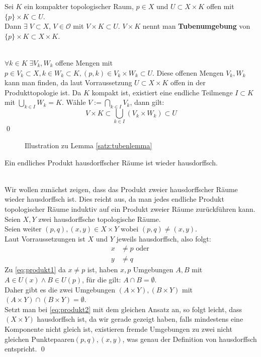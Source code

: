 \begin{Lemma}[Tubenlemma]\label{satz:tubenlemma}
	Sei \(K \) ein kompakter topologischer Raum,  \(p \in X \) und \( U \subset X \times K \) offen mit \( \{p\} \times K \subset U \). \\
	Dann \( \exists \; V \subset X \), \( V \in \mathcal{O} \) mit \( V \times K \subset U \). \( V \times K \) nennt man \textbf{Tubenumgebung} von 
	\( \{p\} \times K \subset X \times K \).
\end{Lemma} 
%
	\\
	\( \forall k \in K \; \exists V_{k}, W_{k}\) offene Mengen mit \( p \in V_{k} \subset X, k \in W_{k} \subset K, (p,k) \in  V_{k} \times W_{k} \subset U\).
	Diese offenen Mengen \(V_{k}, W_{k}\) kann man finden, da laut Vorraussetzung \(U  \subset X \times K \) offen in der Produkttopologie ist.
	Da \(K \) kompakt ist, existiert eine endliche Teilmenge
	\( I \subset K \) mit \( \bigcup_{ k \in I } W_{k} = K \). Wähle \(V := \bigcap_{ k \in I } V_{k} \), dann gilt:
	\[ V \times K \subset \bigcup_{k \in I} (V_{k} \times W_{k}) \subset U \] \qed	\\
%
\begin{figure}[ht]
	\centering
	\def\svgwidth{200}
	
	\label{fig:tubenlemma}
	\caption{Illustration zu Lemma \ref{satz:tubenlemma}}
\end{figure}
%
\begin{Satz}
	Ein endliches Produkt hausdorffscher Räume ist wieder hausdorffsch.
\end{Satz}
%
	\\
	Wir wollen zunächst zeigen, dass das Produkt zweier hausdorffscher Räume wieder hausdorffsch ist. Dies reicht aus, da man jedes endliche Produkt topologischer Räume
	induktiv auf ein Produkt zweier Räume zurückführen kann. \\
	Seien \(X, Y\) zwei hausdorffsche topologische Räume.\\
	Seien weiter \( (p,q), (x,y) \in X \times Y \mbox{ wobei } (p,q) \ne (x,y) \). \\
	Laut Vorraussetzungen ist \(X\) und \(Y\) jeweils hausdorffsch, also folgt: 
	\begin{align}
		x &\ne p \mbox{ oder }\label{eq:produkt1}\\ 
		y &\ne q\label{eq:produkt2} 
	\end{align}
	Zu \eqref{eq:produkt1} da \(x \ne p \) ist, haben \(x, p \) Umgebungen \(A, B \) mit \( A \in U(x)  \land B \in U(p) \), für die gilt: \(A \cap B = \emptyset \).\\ Daher gibt es die
	zwei Umgebungen \( (A \times Y), (B \times Y) \) mit \( (A \times Y) \cap (B \times Y) = \emptyset \). \\
	Setzt man bei \eqref{eq:produkt2} mit dem gleichen Ansatz an, so folgt leicht, dass \( (X \times Y) \) hausdorffsch ist, da wir gerade gezeigt haben, falls mindestens eine Komponente
	nicht gleich ist, existieren fremde Umgebungen zu zwei nicht gleichen Punktepaaren\( (p,q), (x,y) \), was genau der Definition von hausdorffsch entspricht.
\qed

